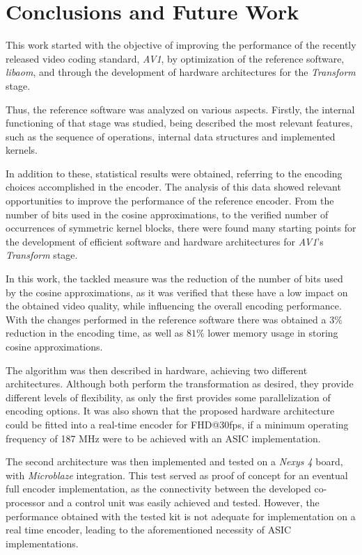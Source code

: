 \cleardoublepage
\chapter{Conclusions and Future Work}


This work started with the objective of improving the performance of the recently released video coding standard, \emph{AV1}, by optimization of the reference software, \emph{libaom}, and through the development of hardware architectures for the \emph{Transform} stage.

Thus, the reference software was analyzed on various aspects. Firstly, the internal functioning of that stage was studied, being described the most relevant features, such as the sequence of operations, internal data structures and implemented kernels.

In addition to these, statistical results were obtained, referring to the encoding choices accomplished in the encoder. The analysis of this data showed relevant opportunities to improve the performance of the reference encoder. From the number of bits used in the cosine approximations, to the verified number of occurrences of symmetric kernel blocks, there were found many starting points for the development of efficient software and hardware architectures for \emph{AV1}'s \emph{Transform} stage.

In this work, the tackled measure was the reduction of the number of bits used by the cosine approximations, as it was verified that these have a low impact on the obtained video quality, while influencing the overall encoding performance. With the changes performed in the reference software there was obtained a $3\%$ reduction in the encoding time, as well as $81\%$ lower memory usage in storing cosine approximations.

The algorithm was then described in hardware, achieving two different architectures. Although both perform the transformation as desired, they provide different levels of flexibility, as only the first provides some parallelization of encoding options. It was also shown that the proposed hardware architecture could be fitted into a real-time encoder for FHD@30fps, if a minimum operating frequency of 187 MHz were to be achieved with an ASIC implementation.

The second architecture was then implemented and tested on a \emph{Nexys 4} board, with \emph{Microblaze} integration. This test served as proof of concept for an eventual full encoder implementation, as the connectivity between the developed co-processor and a control unit was easily achieved and tested. However, the  performance obtained with the tested kit is not adequate for implementation on a real time encoder, leading to the aforementioned necessity of ASIC implementations.

